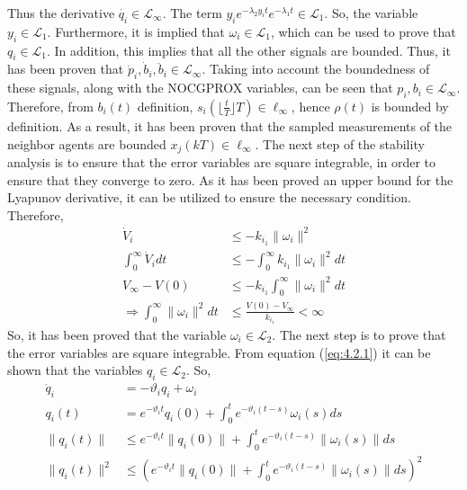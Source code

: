     Thus the derivative $\dot{q_i} \in \mathcal{L}_{\infty}$. The term $y_ie^{-\lambda_2 y_i t} e^{-\lambda_1 t} \in \mathcal{L}_1$. So, the variable $y_i \in \mathcal{L}_1$. Furthermore, it is implied that $\omega_i \in \mathcal{L}_1$, which can be used to prove that $q_i \in \mathcal{L}_1$. In addition, this implies that all the other signals are bounded. Thus, it has been proven that $\dot{p}_i, \dot{b}_i, \ddot{b}_i \in \mathcal{L}_{\infty}$. Taking into account the boundedness of these signals, along with the NOCGPROX variables, can be seen that $p_i, b_i \in \mathcal{L}_{\infty}$. Therefore, from $b_i(t)$ definition, $s_i(\lfloor \frac{t}{T} \rfloor T) \in \mathcal{\ell}_{\infty}$, hence $\rho(t)$ is bounded by definition. As a result, it has been proven that the sampled measurements of the neighbor agents are bounded $x_j(kT) \in \mathcal{\ell}_{\infty}$. The next step of the stability analysis is to ensure that the error variables are square integrable, in order to ensure that they converge to zero. As it has been proved an upper bound for the Lyapunov derivative, it can be utilized to ensure the necessary condition. Therefore,
    \begin{equation*}
        \begin{align}
            \dot{V}_i &\leq -k_{i_1}\lVert \omega_i \rVert ^2\\
            \int_{0}^{\infty} \dot{V}_i dt & \leq -\int_{0}^{\infty} k_{i_1}\lVert \omega_i \rVert ^2 dt\\
            V_{\infty} - V(0) &\leq -k_{i_1} \int_{0}^{\infty} \lVert \omega_i \rVert ^2dt\\
            \Rightarrow \int_{0}^{\infty} \lVert \omega_i \rVert ^2dt &\leq \frac{V(0) - V_{\infty}}{k_{i_1}} < \infty
        \end{align}
    \end{equation*}
    So, it has been proved that the variable $\omega_i \in \mathcal{L}_2$. The next step is to prove that the error variables are square integrable. From equation (\ref{eq:4.2.1}) it can be shown that the variables $q_i \in \mathcal{L}_2$. So,
    \begin{equation*}
        \begin{align}
            \dot{q}_i &= -\vartheta_i q_i + \omega_i\\
            q_i(t) &= e^{-\vartheta_i t}q_i(0) + \int_{0}^{t} e^{-\vartheta_i (t - s)} \omega_i (s) ds\\
            \lVert q_i(t) \rVert & \leq e^{-\vartheta_i t} \lVert q_i(0) \rVert + \int_{0}^{t} e^{-\vartheta_i (t - s)} \lVert \omega_i (s) \rVert ds\\
            \lVert q_i(t) \rVert^2 & \leq \left(e^{-\vartheta_i t} \lVert q_i(0) \rVert + \int_{0}^{t} e^{-\vartheta_i (t - s)} \lVert \omega_i (s) \rVert ds\right)^2
        \end{align}
    \end{equation*}
